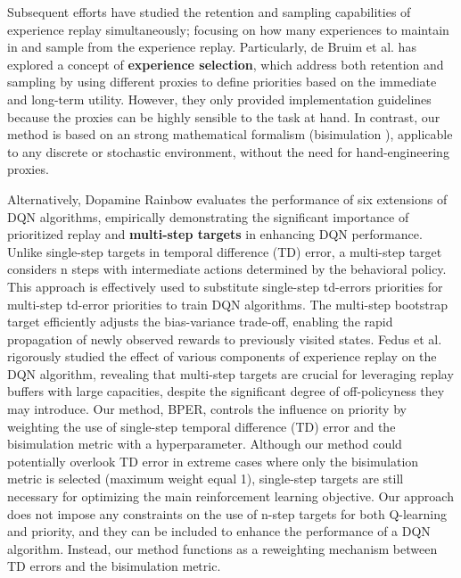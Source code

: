 Subsequent efforts have studied the retention and sampling capabilities of experience replay simultaneously; focusing on how many experiences to maintain in and sample from the experience replay.  Particularly, de Bruim et al. \cite{de2018experience} has explored a concept of \textbf{experience selection}, which address both retention and sampling by using different proxies to define priorities based on the immediate and long-term utility. However, they only provided implementation guidelines because the proxies can be highly sensible to the task at hand. In contrast, our method is based on an strong mathematical formalism (bisimulation \cite{li2006towards}), applicable to any discrete or stochastic environment, without the need for hand-engineering proxies.

Alternatively, Dopamine Rainbow \cite{hessel2018rainbow} evaluates the performance of six extensions of DQN algorithms, empirically demonstrating the significant importance of prioritized replay and \textbf{multi-step targets} in enhancing DQN performance. Unlike single-step targets in temporal difference (TD) error, a multi-step target considers n steps with intermediate actions determined by the behavioral policy. This approach is effectively used to substitute single-step td-errors priorities for multi-step td-error priorities to train DQN algorithms. The multi-step bootstrap target \cite{sutton1988learning, sutton2018reinforcement} efficiently adjusts the bias-variance trade-off, enabling the rapid propagation of newly observed rewards to previously visited states. Fedus et al. \cite{fedus2020revisiting} rigorously studied the effect of various components of experience replay on the DQN algorithm, revealing that multi-step targets are crucial for leveraging replay buffers with large capacities, despite the significant degree of off-policyness they may introduce. Our method, BPER, controls the influence on priority by weighting the use of single-step temporal difference (TD) error and the bisimulation metric with a hyperparameter. Although our method could potentially overlook TD error in extreme cases where only the bisimulation metric is selected (maximum weight equal 1), single-step targets are still necessary for optimizing the main reinforcement learning objective. Our approach does not impose any constraints on the use of n-step targets for both Q-learning and priority, and they can be included to enhance the performance of a DQN algorithm. Instead, our method functions as a reweighting mechanism between TD errors and the bisimulation metric.

